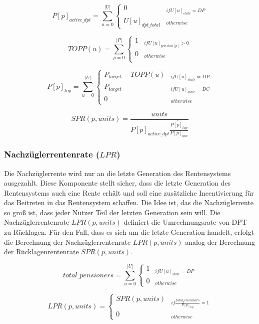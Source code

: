 \begin{equation}
P[p]_{active\_dpt} = \sum_{u=0}^{|U|} \begin{cases} 
0 & _{if U[u]_{state} = DP}\\
U[u]_{dpt\_total} & _{otherwise}
\end{cases}
\end{equation}

\begin{equation*}
TOPP(u) = \sum_{p=0}^{|P|} \begin{cases}
1 & _{if U[u]_{pension[p]} > 0}\\
0 & _{otherwise}\\
\end{cases}
\end{equation*}



\begin{equation}
P[p]_{top} = \sum_{u=0}^{|U|} \begin{cases} 
P_{target} - TOPP(u)  & _{if U[u]_{state} = DP}\\
P_{target} & _{if U[u]_{state} = DC}\\
0 & _{otherwise}
\end{cases}
\end{equation}

\begin{equation}
SPR(p, units) = \frac{units} {P[p]_{active\_dpt} \dot {\frac{P[p]_{top}} {P[p]_{auc}}}
}
\end{equation}


\subsubsection{Nachzüglerrentenrate ($LPR$)}

Die Nachzüglerrente wird nur an die letzte Generation des 
Rentensystems ausgezahlt. Diese Komponente stellt sicher, dass die letzte
Generation des Rentensystems auch eine Rente erhält und soll eine zusätzliche Incentivierung für das Beitreten in das Rentensystem schaffen. Die Idee ist, das die Nachzüglerrente so groß ist, dass jeder Nutzer Teil der letzten Generation sein will. 
Die Nachzüglerrentenrate $LPR(p, units)$ definiert die Umrechnungsrate von DPT zu Rücklagen. Für den Fall, dass es sich um die letzte Generation handelt, erfolgt die Berechnung der Nachzüglerrentenrate $LPR(p, units)$ analog der Berechnung der Rücklagenrentenrate $SPR(p, units)$.

\begin{equation}
total\_pensioners =  \sum_{u=0}^{|U|} \begin{cases} 
1  & _{if U[u]_{state} = DP}\\
0 & _{otherwise}
\end{cases}
\end{equation}

\begin{equation}
LPR(p, units) =  \begin{cases} 
SPR(p, units)  & _{if \frac{total_pensioners} {P[p]_{top}} = 1}\\
0 & _{otherwise}
\end{cases}
\end{equation}$  $